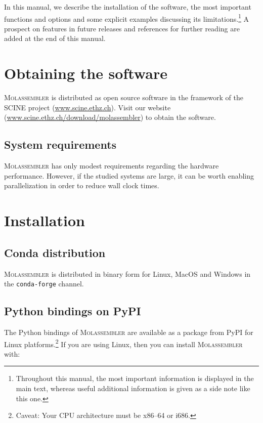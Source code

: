 \documentclass[]{tufte-book}
\begin{document}
In this manual, we describe the installation of the software, the most important
functions and options and some explicit examples discussing its
limitations.\footnote{Throughout this manual, the most important information is
displayed in the main text, whereas useful additional information is given as a
side note like this one.} A prospect on features in future releases and
references for further reading are added at the end of this
manual.\enlargethispage{\baselineskip}



\chapter{Obtaining the software}
\label{ch:obtain}

\textsc{Molassembler}  is distributed as open source software in the framework of the SCINE project (\href{https://scine.ethz.ch/}{www.scine.ethz.ch}).
Visit our website
(\href{https://scine.ethz.ch/download/molassembler}{www.scine.ethz.ch/download/molassembler}) to obtain the software. 


\section{System requirements}

\textsc{Molassembler} has only modest requirements regarding the hardware
performance. However, if the studied systems are large, it can be worth enabling
parallelization in order to reduce wall clock times.



\chapter{Installation}\label{ch:installation}

\section{Conda distribution}

\textsc{Molassembler} is distributed in binary form for Linux, MacOS and Windows
in the \texttt{conda-forge} channel.

\section{Python bindings on PyPI}

The Python bindings of \textsc{Molassembler} are available as a package from
PyPI for Linux platforms.\footnote{Caveat: Your CPU architecture must be
x86--64 or i686.} If you are using Linux, then you can install
\textsc{Molassembler} with:
\end{document}
